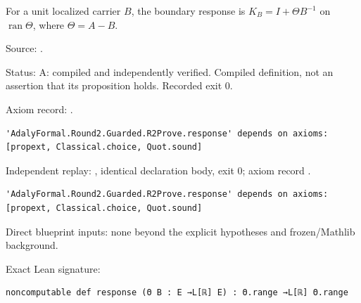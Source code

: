 \begin{definition}[bp-010]
\label{bp-010}
\uses{}
\leanok
For a unit localized carrier \(B\), the boundary response is \(K_B=I+\Theta B^{-1}\) on \(\operatorname{ran}\Theta\), where \(\Theta=A-B\).

\par Source: \texttt{}.
\par Status: A: compiled and independently verified. Compiled definition, not an assertion that its proposition holds. Recorded exit 0.
\par Axiom record: \texttt{}.
\begin{verbatim}
'AdalyFormal.Round2.Guarded.R2Prove.response' depends on axioms: [propext, Classical.choice, Quot.sound]
\end{verbatim}
\par Independent replay: \texttt{}, identical declaration body, exit 0; axiom record \texttt{}.
\begin{verbatim}
'AdalyFormal.Round2.Guarded.R2Prove.response' depends on axioms: [propext, Classical.choice, Quot.sound]
\end{verbatim}
\par Direct blueprint inputs: none beyond the explicit hypotheses and frozen/Mathlib background.
\par Exact Lean signature:
\begin{verbatim}
noncomputable def response (Θ B : E →L[ℝ] E) : Θ.range →L[ℝ] Θ.range
\end{verbatim}
\end{definition}

